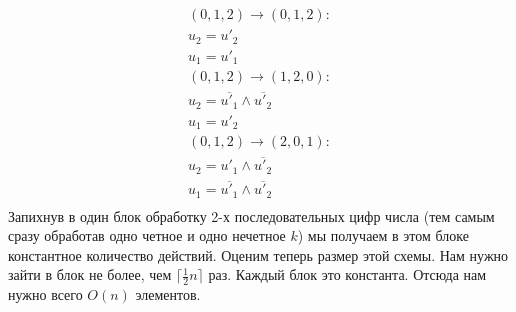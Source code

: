 \documentclass[11pt,a4paper]{scrartcl}
\begin{document}
\begin{gather*}
	(0, 1, 2) \rightarrow (0, 1, 2): \\
	u_2 = u'_2 \\
	u_1 = u'_1 \\
	(0, 1, 2) \rightarrow (1, 2, 0): \\	
	u_2 = \overline{u'_1} \land \overline{u'_2} \\
	u_1 = u'_2 \\
	(0, 1, 2) \rightarrow (2, 0, 1): \\	
	u_2 = u'_1 \land \overline{u'_2} \\
	u_1 =  \overline{u'_1} \land \overline{u'_2} \\
\end{gather*}
Запихнув в один блок обработку 2-х последовательных  цифр числа (тем самым сразу обработав одно четное и одно нечетное $ k $) мы получаем в этом блоке константное количество действий. Оценим теперь размер этой схемы. Нам нужно зайти в блок не более, чем $ \lceil\frac12 n \rceil$ раз. Каждый блок это константа. Отсюда нам нужно всего $ O(n) $ элементов.
\newpage
\end{document}
